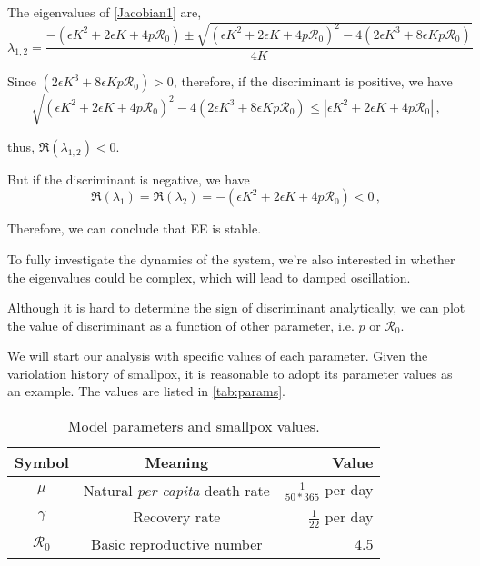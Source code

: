 \documentclass[12pt]{article}
\newcommand{\R}{\mathcal{R}}
\begin{document}
The eigenvalues of \autoref{Jacobian1} are,
\begin{equation}
\lambda_{1,2} = \frac{-(\epsilon K^2+2\epsilon K +4p\mathcal{R}_0) \pm \sqrt{(\epsilon K^2+2\epsilon K +4p\mathcal{R}_0)^2-4(2\epsilon K^3+8\epsilon Kp\mathcal{R}_0)}}{4K}
\end{equation}

Since $(2\epsilon K^3+8\epsilon Kp\mathcal{R}_0)>0$, therefore, if the discriminant is positive, we have
\begin{equation}
\sqrt{(\epsilon K^2+2\epsilon K +4p\mathcal{R}_0)^2-4(2\epsilon
  K^3+8\epsilon Kp\mathcal{R}_0)}
 \leq|\epsilon K^2+2\epsilon K +4p\mathcal{R}_0|  \,,
\end{equation}

thus, $\Re(\lambda_{1,2})<0$.

But if the discriminant is negative, we have
\begin{equation}
\Re(\lambda_1)=\Re(\lambda_2)=-(\epsilon K^2+2\epsilon K +4p\mathcal{R}_0)<0  \,,
\end{equation}

Therefore, we can conclude that EE is stable.

To fully investigate the dynamics of the system, we're also interested in whether the eigenvalues could be complex, which will lead to damped oscillation. 

Although it is hard to determine the sign of discriminant analytically, we can plot the value of discriminant as a function of other parameter, i.e. $p$ or $\R_0$.

We will start our analysis with specific values of each parameter. Given the variolation history of smallpox, it is reasonable to adopt its parameter values as an example. The values are listed in \autoref{tab:params}.

\begin{table}[H]
\begin{center}
\caption{Model parameters and smallpox values.}
\label{tab:params}
\smallskip
\begin{tabular}{c|c|r}
{\bfseries Symbol} & {\bfseries Meaning} & {\bfseries Value} \\\hline
$\mu$ & Natural \emph{per capita} death rate & $\frac{1}{50*365}$ per day \\
$\gamma$ & Recovery rate & $\frac{1}{22}$ per day \\
$\R_0$ & Basic reproductive number & 4.5
\end{tabular}
\end{center}
\end{table}
\end{document}
